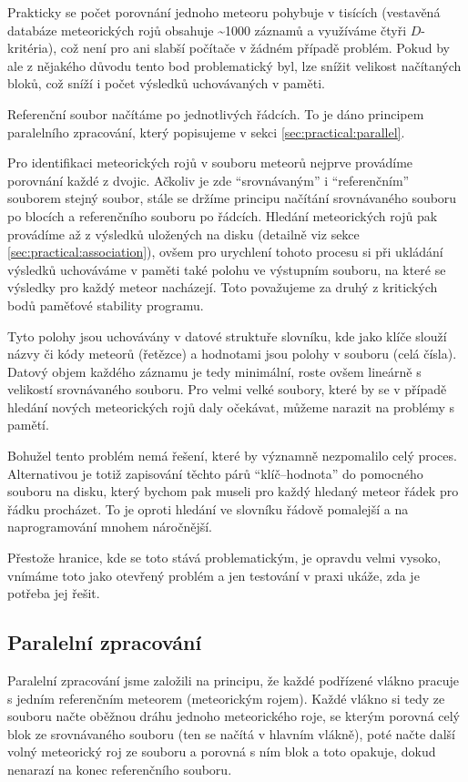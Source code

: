 Prakticky se počet porovnání jednoho meteoru pohybuje v tisících (vestavěná databáze meteorických rojů obsahuje \textasciitilde1000 záznamů a využíváme čtyři $D$-kritéria), což není pro ani slabší počítače v žádném případě problém. Pokud by ale z nějakého důvodu tento bod problematický byl, lze snížit velikost načítaných bloků, což sníží i počet výsledků uchovávaných v paměti.

\medskip

Referenční soubor načítáme po jednotlivých řádcích. To je dáno principem paralelního zpracování, který popisujeme v sekci \ref{sec:practical:parallel}.

\medskip

Pro identifikaci meteorických rojů v souboru meteorů nejprve provádíme porovnání každé z dvojic. Ačkoliv je zde "`srovnávaným"' i "`referenčním"' souborem stejný soubor, stále se držíme principu načítání srovnávaného souboru po blocích a referenčního souboru po řádcích. Hledání meteorických rojů pak provádíme až z výsledků uložených na disku (detailně viz sekce \ref{sec:practical:association}), ovšem pro urychlení tohoto procesu si při ukládání výsledků uchováváme v paměti také polohu ve výstupním souboru, na které se výsledky pro každý meteor nacházejí. Toto považujeme za druhý z kritických bodů paměťové stability programu.

\smallskip

Tyto polohy jsou uchovávány v datové struktuře slovníku, kde jako klíče slouží názvy či kódy meteorů (řetězce) a hodnotami jsou polohy v souboru (celá čísla). Datový objem každého záznamu je tedy minimální, roste ovšem lineárně s velikostí srovnávaného souboru. Pro velmi velké soubory, které by se v případě hledání nových meteorických rojů daly očekávat, můžeme narazit na problémy s pamětí.

Bohužel tento problém nemá řešení, které by významně nezpomalilo celý proces. Alternativou je totiž zapisování těchto párů "`klíč--hodnota"' do pomocného souboru na disku, který bychom pak museli pro každý hledaný meteor řádek pro řádku procházet. To je oproti hledání ve slovníku řádově pomalejší a na naprogramování mnohem náročnější.

Přestože hranice, kde se toto stává problematickým, je opravdu velmi vysoko, vnímáme toto jako otevřený problém a jen testování v praxi ukáže, zda je potřeba jej řešit.

\subsection{Paralelní zpracování\label{sec:practical:parallel}}%
Paralelní zpracování jsme založili na principu, že každé podřízené vlákno pracuje s jedním referenčním meteorem (meteorickým rojem). Každé vlákno si tedy ze souboru načte oběžnou dráhu jednoho meteorického roje, se kterým porovná celý blok ze srovnávaného souboru (ten se načítá v hlavním vlákně), poté načte další volný meteorický roj ze souboru a porovná s ním blok a toto opakuje, dokud nenarazí na konec referenčního souboru.

